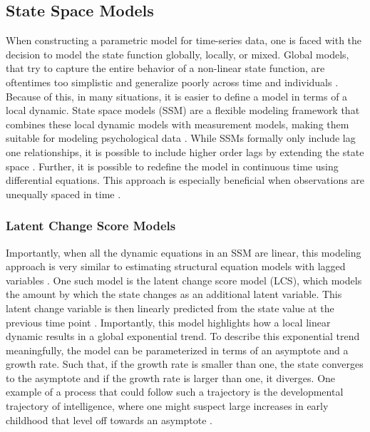 \subsection{State Space Models}

When constructing a parametric model for time-series data, one is faced with the 
decision to model the state function globally, locally, or mixed. Global models, 
that try to capture the entire behavior of a non-linear state function, are 
oftentimes too simplistic and generalize poorly across time and individuals 
\parencite{hunter_two_2022}. Because of this, in many situations, it is easier to 
define a model in terms of a local dynamic. State space models (SSM) are a 
flexible modeling framework that combines these local dynamic models with 
measurement models, making them suitable for modeling psychological data 
\parencite{durbin_time_2012}. While SSMs formally only include lag one relationships, 
it is possible to include higher order lags by extending the 
state space \parencite{hunter_state_2018}. Further, it is possible 
to redefine the model in continuous time using differential equations. This approach is 
especially beneficial when observations are unequally spaced in time
\parencite{van_montfort_continuous_2018}.

\subsubsection{Latent Change Score Models}

Importantly, when all the dynamic equations in an SSM are linear, this modeling approach is 
very similar to estimating structural equation models with lagged variables 
\parencite{asparouhov_dynamic_2018, usami_unified_2019}. One such model is the latent change score
model (LCS), which models the amount by which the state changes as an additional latent variable. 
This latent change variable is then linearly predicted from the state value at the previous time 
point \parencite{cancer_dynamical_2021, cancer_effectiveness_2023}. Importantly, this model 
highlights how a local linear dynamic results in a global exponential 
trend. To describe this exponential trend meaningfully, the model can be parameterized in terms of an asymptote and a 
growth rate. Such that, if the growth rate is smaller than one, the state converges 
to the asymptote and if the growth rate is larger than one, it diverges. One example of a process 
that could follow such a trajectory is the developmental trajectory of intelligence, 
where one might suspect large increases in early childhood 
that level off towards an asymptote \parencite{savi_evolving_2021}.


